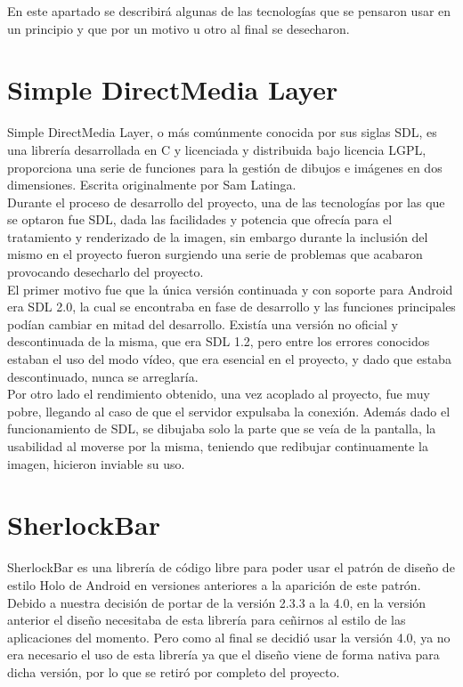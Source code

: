 En este apartado se describirá algunas de las tecnologías que se pensaron usar en un principio y que por un motivo u otro al final se desecharon.

\section{Simple DirectMedia Layer}

Simple DirectMedia Layer, o más comúnmente conocida por sus siglas SDL, es una librería desarrollada en C y licenciada y distribuida bajo licencia LGPL, proporciona una serie de funciones para la gestión de dibujos e imágenes en dos dimensiones. Escrita originalmente por Sam Latinga.\\

Durante el proceso de desarrollo del proyecto, una de las tecnologías por las que se optaron fue SDL, dada las facilidades y potencia que ofrecía para el tratamiento y renderizado de la imagen, sin embargo durante la inclusión del mismo en el proyecto fueron surgiendo una serie de problemas que acabaron provocando desecharlo del proyecto.\\

El primer motivo fue que la única versión continuada y con soporte para Android era SDL 2.0, la cual se encontraba en fase de desarrollo y las funciones principales podían cambiar en mitad del desarrollo. Existía una versión no oficial y descontinuada de la misma, que era SDL 1.2, pero entre los errores conocidos estaban el uso del modo vídeo, que era esencial en el proyecto, y dado que estaba descontinuado, nunca se arreglaría.\\

Por otro lado el rendimiento obtenido, una vez acoplado al proyecto, fue muy pobre, llegando al caso de que el servidor expulsaba la conexión. Además dado el funcionamiento de SDL, se dibujaba solo la parte que se veía de la pantalla, la usabilidad al moverse por la misma, teniendo que redibujar continuamente la imagen, hicieron inviable su uso.

\section{SherlockBar}

SherlockBar es una librería de código libre para poder usar el patrón de diseño de estilo Holo de Android en versiones anteriores a la aparición de este patrón. Debido a nuestra decisión de portar de la versión 2.3.3 a la 4.0, en la versión anterior el diseño necesitaba de esta librería para ceñirnos al estilo de las aplicaciones del momento. Pero como al final se decidió usar la versión 4.0, ya no era necesario el uso de esta librería ya que el diseño viene de forma nativa para dicha versión, por lo que se retiró por completo del proyecto.
